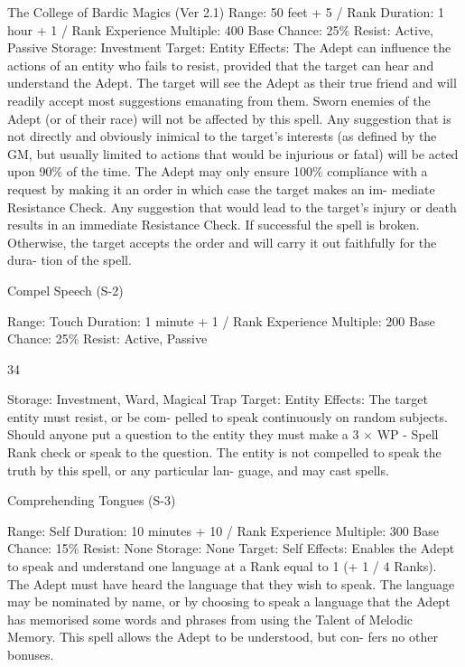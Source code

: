 \begin{Chapter}{The College of Bardic Magics (Ver 2.1)}
Range: 50 feet + 5 / Rank 
Duration: 1 hour + 1 / Rank 
Experience Multiple: 400 
Base Chance: 25\% 
Resist: Active, Passive 
Storage: Investment 
Target: Entity 
Effects: The  Adept can influence the actions of an 
entity  who  fails  to  resist,  provided  that  the  target 
can hear and understand the Adept. The target will 
see  the  Adept  as  their  true  friend  and  will  readily 
accept  most  suggestions  emanating  from  them. 
Sworn enemies of the Adept (or of their race) will 
not be affected by this spell. Any suggestion that is 
not  directly  and  obviously  inimical  to  the  target’s 
interests (as defined by the GM, but usually limited 
to  actions that  would  be  injurious  or  fatal)  will  be 
acted upon  90\%  of  the  time.  The  Adept  may  only 
ensure 100\% compliance with a request by making 
it  an  order  in  which  case  the  target  makes  an  im-
mediate  Resistance  Check.  Any  suggestion  that 
would lead to the target’s injury or death results in 
an  immediate  Resistance  Check.  If  successful  the 
spell  is  broken.  Otherwise,  the  target  accepts  the 
order  and  will  carry  it  out  faithfully  for  the  dura-
tion of the spell. 

Compel Speech (S-2) 

Range: Touch 
Duration: 1 minute + 1 / Rank 
Experience Multiple: 200 
Base Chance: 25\% 
Resist: Active, Passive 

34 

Storage: Investment, Ward, Magical Trap 
Target: Entity 
Effects:  The  target  entity  must  resist,  or  be  com-
pelled  to  speak  continuously  on  random  subjects. 
Should  anyone  put  a  question  to  the  entity  they 
must make a 3 × WP  - Spell Rank check or speak 
to  the  question.  The  entity  is  not  compelled  to 
speak the truth by this spell, or any  particular lan-
guage, and may cast spells. 

Comprehending Tongues (S-3) 

Range: Self 
Duration: 10 minutes + 10 / Rank 
Experience Multiple: 300 
Base Chance: 15\% 
Resist: None 
Storage: None 
Target: Self 
Effects: Enables the Adept to speak and understand 
one language at a Rank equal to 1 (+ 1 / 4 Ranks). 
The Adept must have heard the language that they 
wish to speak. The language may be nominated by 
name, or by choosing to speak a language that the 
Adept  has  memorised  some  words  and  phrases 
from  using  the  Talent  of  Melodic  Memory.  This 
spell  allows  the  Adept  to  be  understood,  but  con-
fers no other bonuses. 


\end{Chapter}
